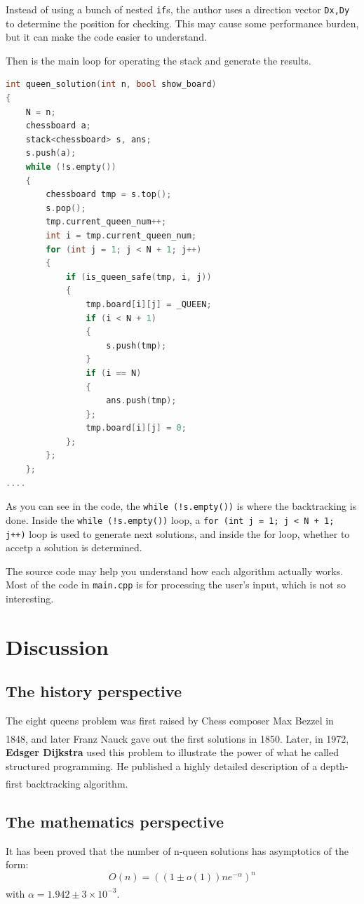 \documentclass[cn,black,12pt,normal]{elegantnote}
\newcommand{\uct}[1]{\textsuperscript{\textsuperscript{\cite{#1}}}}
\begin{document}
Instead of using a bunch of nested \lstinline{if}s, the author uses a direction vector \lstinline{Dx,Dy} to determine the position for checking. This may cause some performance burden, but it can make the code easier to understand.

Then is the main loop for operating the stack and generate the results.

\begin{lstlisting}[language = C++]
int queen_solution(int n, bool show_board)
{
	N = n;
	chessboard a;
	stack<chessboard> s, ans;
	s.push(a);
	while (!s.empty())
	{
		chessboard tmp = s.top();
		s.pop();
		tmp.current_queen_num++;
		int i = tmp.current_queen_num;
		for (int j = 1; j < N + 1; j++)
		{
			if (is_queen_safe(tmp, i, j))
			{
				tmp.board[i][j] = _QUEEN;
				if (i < N + 1)
				{
					s.push(tmp);
				}
				if (i == N)
				{
					ans.push(tmp);
				};
				tmp.board[i][j] = 0;
			};
		};
	};
....
\end{lstlisting}
As you can see in the code, the \lstinline{while (!s.empty())} is where the backtracking is done. Inside the \lstinline{while (!s.empty())} loop, a \lstinline{for (int j = 1; j < N + 1; j++)} loop is used to generate next solutions, and inside the for loop, whether to accetp a solution is determined.

The source code may help you understand how each algorithm actually works. Most of the code in \lstinline{main.cpp} is for processing the user's input, which is not so interesting.

\section{Discussion}

\subsection{The history perspective}
The eight queens problem was first raised by Chess composer Max Bezzel in 1848, and later Franz Nauck gave out the first solutions in 1850.\uct{rouse1960eight} Later, in 1972, \textbf{Edsger Dijkstra} used this problem to illustrate the power of what he called structured programming. He published a highly detailed description of a depth-first backtracking algorithm. \uct{wiki:Eight_queens_puzzle}

\subsection{The mathematics perspective}
It has been proved that the number of n-queen solutions has asymptotics of the form:
\begin{equation}
    O(n) = ((1\pm o(1))ne^{-\alpha})^n
\end{equation}
with $\alpha = 1.942 \pm 3 \times 10^{-3}$\uct{simkin2021number}.
\end{document}
